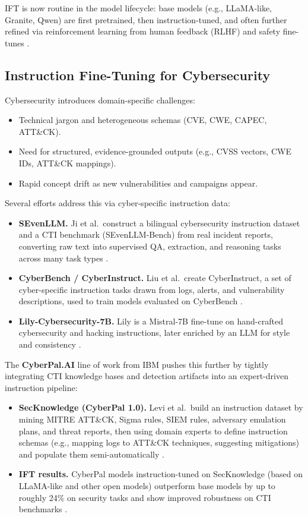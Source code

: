 \documentclass[unnumsec,webpdf,contemporary,large]{oup-authoring-template}
\theoremstyle{thmstyleone}
\theoremstyle{thmstyletwo}
\theoremstyle{thmstylethree}
\begin{document}
IFT is now routine in the model lifecycle: base models (e.g., LLaMA-like, Granite, Qwen) are first pretrained, then instruction-tuned, and often further refined via reinforcement learning from human feedback (RLHF) and safety fine-tunes \cite{ouyang2022instructgpt}.

\subsection{Instruction Fine-Tuning for Cybersecurity}

Cybersecurity introduces domain-specific challenges:

\begin{itemize}
  \item Technical jargon and heterogeneous schemas (CVE, CWE, CAPEC, ATT\&CK).
  \item Need for structured, evidence-grounded outputs (e.g., CVSS vectors, CWE IDs, ATT\&CK mappings).
  \item Rapid concept drift as new vulnerabilities and campaigns appear.
\end{itemize}

Several efforts address this via cyber-specific instruction data:

\begin{itemize}
  \item \textbf{SEvenLLM.} Ji et al.\ construct a bilingual cybersecurity instruction dataset and a CTI benchmark (SEvenLLM-Bench) from real incident reports, converting raw text into supervised QA, extraction, and reasoning tasks across many task types \cite{ji2024sevenllm}.
  \item \textbf{CyberBench / CyberInstruct.} Liu et al.\ create CyberInstruct, a set of cyber-specific instruction tasks drawn from logs, alerts, and vulnerability descriptions, used to train models evaluated on CyberBench \cite{liu2024cyberbench}.
  \item \textbf{Lily-Cybersecurity-7B.} Lily is a Mistral-7B fine-tune on hand-crafted cybersecurity and hacking instructions, later enriched by an LLM for style and consistency \cite{liu2024cyberbench}.
\end{itemize}

The \textbf{CyberPal.AI} line of work from IBM pushes this further by tightly integrating CTI knowledge bases and detection artifacts into an expert-driven instruction pipeline:

\begin{itemize}
  \item \textbf{SecKnowledge (CyberPal 1.0).} Levi et al.\ build an instruction dataset by mining MITRE ATT\&CK, Sigma rules, SIEM rules, adversary emulation plans, and threat reports, then using domain experts to define instruction schemas (e.g., mapping logs to ATT\&CK techniques, suggesting mitigations) and populate them semi-automatically \cite{levi2024cyberpal}.
  \item \textbf{IFT results.} CyberPal models instruction-tuned on SecKnowledge (based on LLaMA-like and other open models) outperform base models by up to roughly 24\% on security tasks and show improved robustness on CTI benchmarks \cite{levi2024cyberpal}.
\end{itemize}
\end{document}
